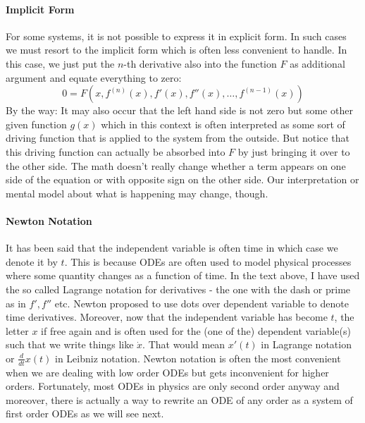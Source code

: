 \paragraph{Implicit Form}
For some systems, it is not possible to express it in explicit form. In such cases we must resort to the implicit form which is often less convenient to handle. In this case, we just put the $n$-th derivative also into the function $F$ as additional argument and equate everything to zero:
\begin{equation}
0 = F(x, f^{(n)}(x), f'(x), f''(x), \ldots, f^{(n-1)}(x))
\end{equation}
By the way: It may also occur that the left hand side is not zero but some other given function $g(x)$ which in this context is often interpreted as some sort of driving function that is applied to the system from the outside. But notice that this driving function can actually be absorbed into $F$ by just bringing it over to the other side. The math doesn't really change whether a term appears on one side of the equation or with opposite sign on the other side. Our interpretation or mental model about what is happening may change, though.

\paragraph{Newton Notation}
It has been said that the independent variable is often time in which case we denote it by $t$. This is because ODEs are often used to model physical processes where some quantity changes as a function of time. In the text above, I have used the so called Lagrange notation for derivatives - the one with the dash or prime as in $f', f''$ etc. Newton proposed to use dots over dependent variable to denote time derivatives. Moreover, now that the independent variable has become $t$, the letter $x$ if free again and is often used for the (one of the) dependent variable(s) such that we write things like $\dot{x}$. That would mean $x'(t)$ in Lagrange notation or $\frac{d}{dt} x(t)$ in Leibniz notation. Newton notation is often the most convenient when we are dealing with low order ODEs but gets inconvenient for higher orders. Fortunately, most ODEs in physics are only second order anyway and moreover, there is actually a way to rewrite an ODE of any order as a system of first order ODEs as we will see next.

